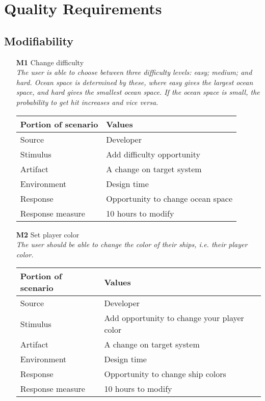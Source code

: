 \chapter{Quality Requirements}
\section{Modifiability}
    \begin{itemize}
        \item[\textbf{M1}] Change difficulty \\
        \textit{\small{The user is able to choose between three difficulty levels: easy; medium; and hard. Ocean space is determined by these, where easy                                                                             gives the largest ocean space, and hard gives the smallest ocean space. If the ocean space is small, the probability to get hit increases and vice versa.}}
        
        \begin{tabular}{| l | l |}
            \hline
            \rowcolor[gray]{0.8}
            \textbf{Portion of scenario} & \textbf{Values} \\
            \hline
            Source &  Developer \\
            Stimulus & Add difficulty opportunity \\
            Artifact & A change on target system \\
            Environment & Design time \\
            Response & Opportunity to change ocean space  \\
            Response measure & 10 hours to modify  \\
            \hline
        \end{tabular}
        
        \item[\textbf{M2}] Set player color \\
        \textit{\small{The user should be able to change the color of their ships, i.e. their player color.}}
        
        \begin{tabular}{| l | l |}
            \hline
            \rowcolor[gray]{0.8}
            \textbf{Portion of scenario} & \textbf{Values} \\
            \hline
            Source & Developer \\
            Stimulus & Add opportunity to change your player color \\
            Artifact & A change on target system \\
            Environment & Design time \\
            Response & Opportunity to change ship colors  \\
            Response measure & 10 hours to modify \\
            \hline
        \end{tabular}
    

\end{itemize}
